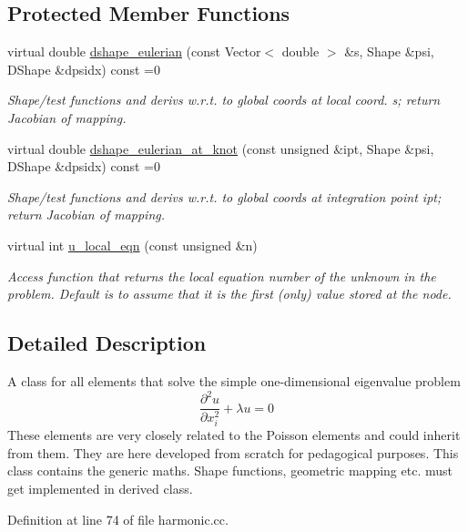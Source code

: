 \subsection*{Protected Member Functions}
\begin{DoxyCompactItemize}
\item 
virtual double \hyperlink{classHarmonicEquations_ae013637e60841f46cf4c452ee3469163}{dshape\+\_\+eulerian} (const Vector$<$ double $>$ \&s, Shape \&psi, D\+Shape \&dpsidx) const =0
\begin{DoxyCompactList}\small\item\em Shape/test functions and derivs w.\+r.\+t. to global coords at local coord. s; return Jacobian of mapping. \end{DoxyCompactList}\item 
virtual double \hyperlink{classHarmonicEquations_aaf04ba09dd948dcb0efb8e7e43da9736}{dshape\+\_\+eulerian\+\_\+at\+\_\+knot} (const unsigned \&ipt, Shape \&psi, D\+Shape \&dpsidx) const =0
\begin{DoxyCompactList}\small\item\em Shape/test functions and derivs w.\+r.\+t. to global coords at integration point ipt; return Jacobian of mapping. \end{DoxyCompactList}\item 
virtual int \hyperlink{classHarmonicEquations_a89ff4c11fade61386745931722a75e1d}{u\+\_\+local\+\_\+eqn} (const unsigned \&n)
\begin{DoxyCompactList}\small\item\em Access function that returns the local equation number of the unknown in the problem. Default is to assume that it is the first (only) value stored at the node. \end{DoxyCompactList}\end{DoxyCompactItemize}


\subsection{Detailed Description}
A class for all elements that solve the simple one-\/dimensional eigenvalue problem \[ \frac{\partial^2 u}{\partial x_i^2} + \lambda u = 0 \] These elements are very closely related to the Poisson elements and could inherit from them. They are here developed from scratch for pedagogical purposes. This class contains the generic maths. Shape functions, geometric mapping etc. must get implemented in derived class. 

Definition at line 74 of file harmonic.\+cc.



